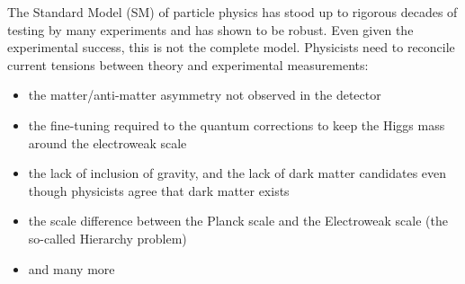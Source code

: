The Standard Model (SM) of particle physics has stood up to rigorous decades of testing by many experiments and has shown to be robust. Even given the experimental success, this is not the complete model. Physicists need to reconcile current tensions between theory and experimental measurements:
\\
\begin{itemize}
	\item the matter/anti-matter asymmetry not observed in the detector%
	\item the fine-tuning required to the quantum corrections to keep the Higgs mass around the electroweak scale%
	\item the lack of inclusion of gravity, and the lack of dark matter candidates even though physicists agree that dark matter exists%
	\item the scale difference between the Planck scale and the Electroweak scale (the so-called Hierarchy problem)%
	\item and many more\\%
\end{itemize}

